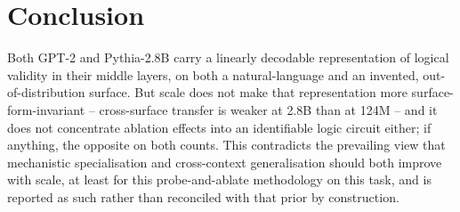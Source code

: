 \section{Conclusion}
Both GPT-2 and Pythia-2.8B carry a linearly decodable representation of
logical validity in their middle layers, on both a natural-language and
an invented, out-of-distribution surface. But scale does not make that
representation more surface-form-invariant -- cross-surface transfer is
weaker at 2.8B than at 124M -- and it does not concentrate ablation
effects into an identifiable logic circuit either; if anything, the
opposite on both counts. This contradicts the prevailing view that
mechanistic specialisation and cross-context generalisation should both
improve with scale, at least for this probe-and-ablate methodology on
this task, and is reported as such rather than reconciled with that
prior by construction.
